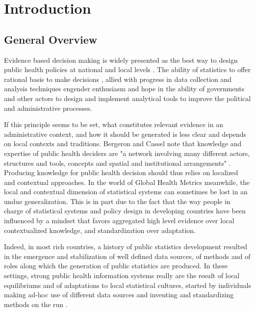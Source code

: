 \section{Introduction}

\subsection{General Overview}

Evidence based decision making is widely presented as the best way to design public health policies at national and local levels \citep{abou-zahr_health_2005,shibuya_health_2005,bambas_nolen_strengthening_2005,mutemwa_hmis_2006,boerma_public_2013}.
The ability of statistics to offer rational basis to make decisions \citep{desrosieres_politique_1993,porter_trust_1996},
allied with progress in data collection and analysis techniques engender enthusiasm and hope in the ability of governments and other actors to design and implement analytical tools to improve the political and administrative processes.

If this principle seems to be set, what constitutes relevant evidence in an administrative context, and how it should be generated is less clear and depends on local contexts and traditions. Bergeron and Cassel note that knowledge and expertise of public health deciders are "a network involving many different actors, structures and tools, concepts and spatial and institutional arrangements" \citep{bergeron_savoirs_2014}. Producing knowledge for public health decision should thus relies on localized and contextual approaches. In the world of Global Health Metrics meanwhile, the local and contextual dimension of statistical systems can sometimes be lost in an undue generalization. This is in part due to the fact that the way people in charge of statistical systems and policy design in developing countries have been influenced by a mindset that favors aggregated high level evidence over local contextualized knowledge, and standardization over adaptation.

Indeed, in most rich countries, a history of public statistics development resulted in the emergence and stabilization of well defined data sources, of methods and of roles along which the generation of public statistics are produced. In these settings, strong public health information systems really are the result of local equilibriums and of adaptations to local statistical cultures, started by individuals making ad-hoc use of different data sources and inventing and standardizing methods on the run \citep{lecuyer_medecins_1987}.

